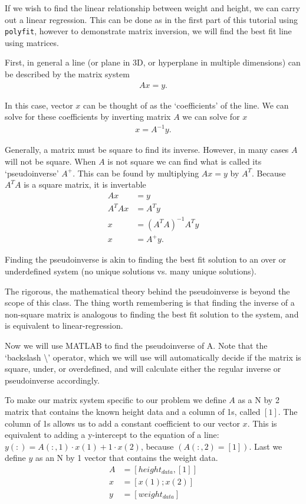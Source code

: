\documentclass[12pt]{article}
\begin{document}
If we wish to find the linear relationship between weight and height, we can carry out a linear regression. This can be done as in the first part of this tutorial using \lstinline|polyfit|, however to demonstrate matrix inversion, we will find the best fit line using matrices. 

First, in general a line (or plane in 3D, or hyperplane in multiple dimensions) can be described by the matrix system
\begin{align*}
Ax=y.
\end{align*}

In this case, vector $x$ can be thought of as the `coefficients' of the line. We can solve for these coefficients by inverting matrix $A$ we can solve for $x$ 
\begin{align*}
x=A^{-1}y.
\end{align*}

Generally, a matrix must be square to find its inverse. However, in many cases $A$ will not be square. When $A$ is not square we can find what is called its `pseudoinverse' $A^{+}$. This can be found by multiplying $Ax=y$ by $A^{T}$. Because $A^{T}A$ is a square matrix, it is invertable 
\begin{align*}
Ax&=y\\
A^{T}Ax&=A^{T}y\\
x&=(A^{T}A)^{-1}A^{T}y\\
x&=A^{+}y.
\end{align*}

Finding the pseudoinverse is akin to finding the best fit solution to an over or underdefined system (no unique solutions vs. many unique solutions).

The rigorous, the mathematical theory behind the pseudoinverse is beyond the scope of this class. The thing worth remembering is that finding the inverse of a non-square matrix is analogous to finding the best fit solution to the system, and is equivalent to linear-regression.  

Now we will use MATLAB to find the pseudoinverse of A. Note that the `backslash \textbackslash' operator, which we will use will automatically decide if the matrix is square, under, or overdefined, and will calculate either the regular inverse or pseudoinverse accordingly. 

To make our matrix system specific to our problem we define $A$ as a N by 2 matrix that contains the known height data and a column of 1s, called $[1]$. The column of 1s allows us to add a constant coefficient to our vector $x$. This is equivalent to adding a y-intercept to the equation of a line: $y(:)=A(:,1)\cdot x(1)+1 \cdot x(2)$, because $(A(:,2)=[1])$. Last we define $y$ as an N by 1 vector that contains the weight data.
\begin{align*}
A&=[height_{data}, [1]]\\
x&=[x(1); x(2)]\\
y&=[weight_{data}]
\end{align*}
\end{document}
